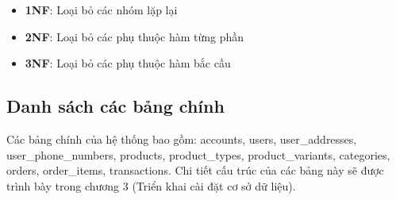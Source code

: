 \begin{itemize}
    \item \textbf{1NF}: Loại bỏ các nhóm lặp lại
    \item \textbf{2NF}: Loại bỏ các phụ thuộc hàm từng phần
    \item \textbf{3NF}: Loại bỏ các phụ thuộc hàm bắc cầu
\end{itemize}

\subsection{Danh sách các bảng chính}

Các bảng chính của hệ thống bao gồm: accounts, users, user\_addresses, user\_phone\_numbers, products, product\_types, product\_variants, categories, orders, order\_items, transactions. Chi tiết cấu trúc của các bảng này sẽ được trình bày trong chương 3 (Triển khai cài đặt cơ sở dữ liệu).